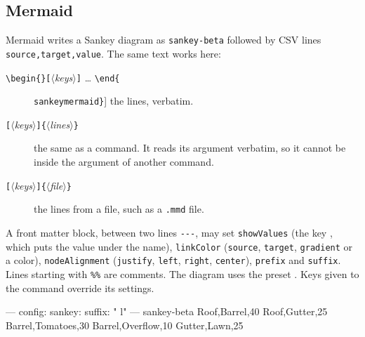 \documentclass[10pt,parskip=half,english,numbers=noenddot,footnotes=nomultiple,oneside]{scrartcl}
\let\T\texttt
\newcommand\meta[1]{\ensuremath{\langle}\textit{#1}\ensuremath{\rangle}}
\newcommand\marg[1]{\T{\{}\meta{#1}\T{\}}}
\newcommand\oarg[1]{\T{[}\meta{#1}\T{]}}
\newcommand\envref[1]{\hyperref[env:#1]{\T{\color{skenv}#1}}}
\begin{document}
\subsection{Mermaid}
Mermaid writes a Sankey diagram as \T{sankey-beta} followed by CSV lines \T{source,target,value}. The same text works here:
\begin{description}
\item[\T{\textbackslash begin\{}\T{\}}\oarg{keys} \dots{} \T{\textbackslash end\{}\envref{sankeymermaid}\T{\}}] the lines, verbatim.
\item[\oarg{keys}\marg{lines}] the same as a command. It reads its argument verbatim, so it cannot be inside the argument of another command.
\item[\oarg{keys}\marg{file}] the lines from a file, such as a \T{.mmd} file.
\end{description}
A front matter block, between two lines \T{-{}-{}-}, may set \T{showValues} (the key , which puts the value under the name), \T{linkColor} (\T{source}, \T{target}, \T{gradient} or a color), \T{nodeAlignment} (\T{justify}, \T{left}, \T{right}, \T{center}), \T{prefix} and \T{suffix}. Lines starting with \T{\%\%} are comments. The diagram uses the preset . Keys given to the command override its settings.
\begin{mermaidexample}
\begin{sankeymermaid}
---
config:
  sankey:
    suffix: " l"
---
sankey-beta
Roof,Barrel,40
Roof,Gutter,25
Barrel,Tomatoes,30
Barrel,Overflow,10
Gutter,Lawn,25
\end{sankeymermaid}
\end{mermaidexample}
\end{document}
